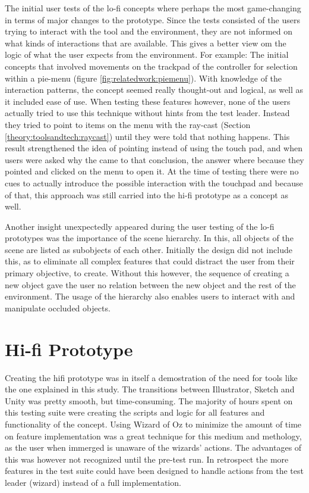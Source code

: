 The initial user tests of the lo-fi concepts where perhaps the most game-changing in terms of major changes to the prototype. Since the tests consisted of the users trying to interact with the tool and the environment, they are not informed on what kinds of interactions that are available. This gives a better view om the logic of what the user expects from the environment. For example: The initial concepts that involved movements on the trackpad of the controller for selection within a pie-menu (figure \ref{fig:relatedwork:piemenu}). With knowledge of the interaction patterns, the concept seemed really thought-out and logical, as well as it included ease of use. When testing these features however, none of the users actually tried to use this technique without hints from the test leader. Instead they tried to point to items on the menu with the ray-cast (Section \ref{theory:toolsandtech:raycast}) until they were told that nothing happens. This result strengthened the idea of pointing instead of using the touch pad, and when users were asked why the came to that conclusion, the answer where because they pointed and clicked on the menu to open it. At the time of testing there were no cues to actually introduce the possible interaction with the touchpad and because of that, this approach was still carried into the hi-fi prototype as a concept as well.

Another insight unexpectedly appeared during the user testing of the lo-fi prototypes was the importance of the scene hierarchy. In this, all objects of the scene are listed as subobjects of each other. Initially the design did not include this, as to eliminate all complex features that could distract the user from their primary objective, to create. Without this however, the sequence of creating a new object gave the user no relation between the new object and the rest of the environment. The usage of the hierarchy also enables users to interact with and manipulate occluded objects.


\section{Hi-fi Prototype}
Creating the hifi prototype was in itself a demostration of the need for tools like the one explained in this study. The transitions between Illustrator, Sketch and Unity was pretty smooth, but time-consuming. The majority of hours spent on this testing suite were creating the scripts and logic for all features and functionality of the concept. Using Wizard of Oz to minimize the amount of time on feature implementation was a great technique for this medium and methology, as the user when immerged is unaware of the wizards' actions. The advantages of this was however not recognized until the pre-test run. In retrospect the more features in the test suite could have been designed to handle actions from the test leader (wizard) instead of a full implementation.

